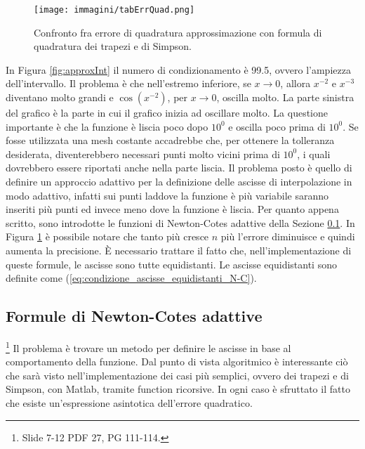 \begin{figure}
    \centering
    \texttt{[image: immagini/tabErrQuad.png]}
    \caption{Confronto fra errore di quadratura approssimazione con formula di quadratura dei trapezi e di Simpson.}\label{fig:tabella_errore_quadratura}
\end{figure}

In Figura \ref{fig:approxInt} il numero di condizionamento è 99.5, ovvero l'ampiezza dell'intervallo. Il problema è che nell'estremo inferiore, se $x\rightarrow 0$, allora $x^{-2}$ e $x^{-3}$ diventano molto grandi e $\cos{(x^{-2})}$, per $x\rightarrow 0$, oscilla molto. La parte sinistra del grafico è la parte in cui il grafico inizia ad oscillare molto. La questione importante è che la funzione è liscia poco dopo $10^0$ e oscilla poco prima di $10^0$. Se fosse utilizzata una mesh costante accadrebbe che, per ottenere la tolleranza desiderata, diventerebbero necessari punti molto vicini prima di $10^0$, i quali dovrebbero essere riportati anche nella parte liscia. Il problema posto è quello di definire un approccio adattivo per la definizione delle ascisse di interpolazione in modo adattivo, infatti sui punti laddove la funzione è più variabile saranno inseriti più punti ed invece meno dove la funzione è liscia. Per quanto appena scritto, sono introdotte le funzioni di Newton-Cotes adattive della Sezione \ref{ssec:formule_newton-cotes_adattive}.
In Figura \ref{fig:tabella_errore_quadratura} è possibile notare che tanto più cresce $n$ più l'errore diminuisce e quindi aumenta la precisione. È necessario trattare il fatto che, nell'implementazione di queste formule, le ascisse sono tutte equidistanti. Le ascisse equidistanti sono definite come (\ref{eq:condizione_ascisse_equidistanti_N-C}).

\subsection{Formule di Newton-Cotes adattive}\label{ssec:formule_newton-cotes_adattive}
\footnote{Slide 7-12 PDF 27, PG 111-114.}
Il problema è trovare un metodo per definire le ascisse in base al comportamento della funzione. Dal punto di vista algoritmico è interessante ciò che sarà visto nell'implementazione dei casi più semplici, ovvero dei trapezi e di Simpson, con Matlab, tramite function ricorsive. In ogni caso è sfruttato il fatto che esiste un'espressione asintotica dell'errore quadratico.

